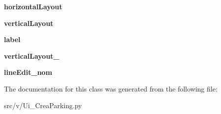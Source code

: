 \begin{DoxyCompactItemize}
\item 
\hypertarget{classsrc_1_1v_1_1_ui___crea_parking_1_1_ui___crea_parking_a04384b533e95f51484b5aad4758229ac}{}{\bfseries horizontal\+Layout}\label{classsrc_1_1v_1_1_ui___crea_parking_1_1_ui___crea_parking_a04384b533e95f51484b5aad4758229ac}

\item 
\hypertarget{classsrc_1_1v_1_1_ui___crea_parking_1_1_ui___crea_parking_aadf4922ae66cc965cd775f37f657d984}{}{\bfseries vertical\+Layout}\label{classsrc_1_1v_1_1_ui___crea_parking_1_1_ui___crea_parking_aadf4922ae66cc965cd775f37f657d984}

\item 
\hypertarget{classsrc_1_1v_1_1_ui___crea_parking_1_1_ui___crea_parking_a2a2974d09f98d03b29331e7e43efbf06}{}{\bfseries label}\label{classsrc_1_1v_1_1_ui___crea_parking_1_1_ui___crea_parking_a2a2974d09f98d03b29331e7e43efbf06}

\item 
\hypertarget{classsrc_1_1v_1_1_ui___crea_parking_1_1_ui___crea_parking_abcea3cce6a8a08d6f5a280d94324d23f}{}{\bfseries vertical\+Layout\+\_}\label{classsrc_1_1v_1_1_ui___crea_parking_1_1_ui___crea_parking_abcea3cce6a8a08d6f5a280d94324d23f}

\item 
\hypertarget{classsrc_1_1v_1_1_ui___crea_parking_1_1_ui___crea_parking_a45c1a04d0ddce193eebd1b989877784d}{}{\bfseries line\+Edit\+\_\+nom}\label{classsrc_1_1v_1_1_ui___crea_parking_1_1_ui___crea_parking_a45c1a04d0ddce193eebd1b989877784d}

\end{DoxyCompactItemize}


The documentation for this class was generated from the following file\+:\begin{DoxyCompactItemize}
\item 
src/v/Ui\+\_\+\+Crea\+Parking.\+py\end{DoxyCompactItemize}

